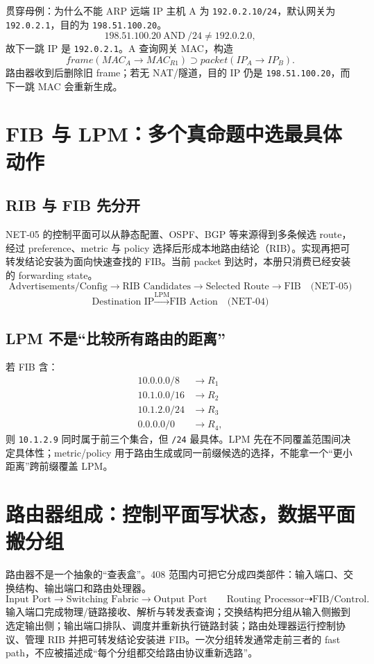\documentclass[11pt,a4paper]{ctexart}
\newcommand{\code}[1]{\texttt{#1}}
\begin{document}
\begin{examplebox}{贯穿母例：为什么不能 ARP 远端 IP}
主机 A 为 \code{192.0.2.10/24}，默认网关为 \code{192.0.2.1}，目的为 \code{198.51.100.20}。
\[
198.51.100.20\ \mathrm{AND}\ /24\ne192.0.2.0,
\]
故下一跳 IP 是 \code{192.0.2.1}。A 查询网关 MAC，构造
\[
frame(MAC_A\to MAC_{R1})
\supset
packet(IP_A\to IP_B).
\]
路由器收到后删除旧 frame；若无 NAT/隧道，目的 IP 仍是 \code{198.51.100.20}，而下一跳 MAC 会重新生成。
\end{examplebox}

\section{FIB 与 LPM：多个真命题中选最具体动作}

\subsection{RIB 与 FIB 先分开}

NET-05 的控制平面可以从静态配置、OSPF、BGP 等来源得到多条候选 route，经过 preference、metric 与 policy 选择后形成本地路由结论（RIB）。实现再把可转发结论安装为面向快速查找的 FIB。当前 packet 到达时，本册只消费已经安装的 forwarding state。
\[
\boxed{\text{Advertisements/Config}\to\text{RIB Candidates}\to\text{Selected Route}\to\text{FIB}}
\quad\text{(NET-05)}
\]
\[
\boxed{\text{Destination IP}\xrightarrow{\mathrm{LPM}}\text{FIB Action}}
\quad\text{(NET-04)}
\]

\subsection{LPM 不是“比较所有路由的距离”}

若 FIB 含：
\[
\begin{array}{ll}
10.0.0.0/8 & \to R_1\\
10.1.0.0/16 & \to R_2\\
10.1.2.0/24 & \to R_3\\
0.0.0.0/0 & \to R_4,
\end{array}
\]
则 \code{10.1.2.9} 同时属于前三个集合，但 \code{/24} 最具体。LPM 先在不同覆盖范围间决定具体性；metric/policy 用于路由生成或同一前缀候选的选择，不能拿一个“更小距离”跨前缀覆盖 LPM。

\section{路由器组成：控制平面写状态，数据平面搬分组}

路由器不是一个抽象的“查表盒”。408 范围内可把它分成四类部件：输入端口、交换结构、输出端口和路由处理器。
\[
\boxed{
\text{Input Port}\to\text{Switching Fabric}\to\text{Output Port}
}
\qquad
\boxed{
\text{Routing Processor}\dashrightarrow\text{FIB/Control}
}.
\]
输入端口完成物理/链路接收、解析与转发表查询；交换结构把分组从输入侧搬到选定输出侧；输出端口排队、调度并重新执行链路封装；路由处理器运行控制协议、管理 RIB 并把可转发结论安装进 FIB。一次分组转发通常走前三者的 fast path，不应被描述成“每个分组都交给路由协议重新选路”。
\end{document}
